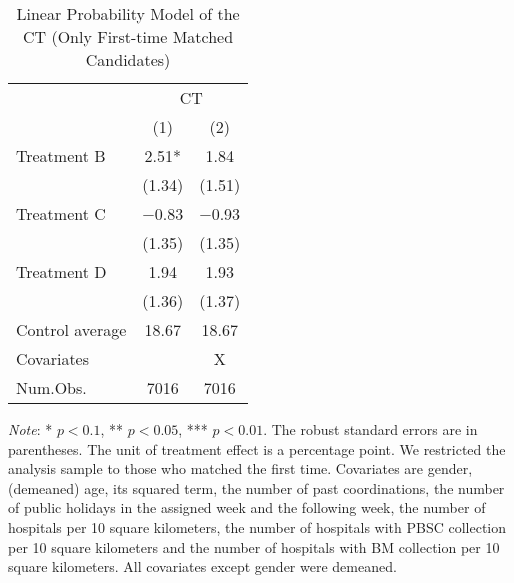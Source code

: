 \documentclass[12pt, a4paper]{article}
\begin{document}
\begin{table}[H]

\caption{\label{tab:lm-test-initial}Linear Probability Model of the CT (Only First-time Matched Candidates)}
\centering
\fontsize{8}{10}\selectfont
\begin{threeparttable}
\begin{tabular}[t]{>{\raggedright\arraybackslash}p{20em}cc}
\toprule
\multicolumn{1}{c}{ } & \multicolumn{2}{c}{CT} \\
\cmidrule(l{3pt}r{3pt}){2-3}
  & (1) & (2)\\
\midrule
Treatment B & \num{2.51}* & \num{1.84}\\
 & (\num{1.34}) & (\num{1.51})\\
Treatment C & \num{-0.83} & \num{-0.93}\\
 & (\num{1.35}) & (\num{1.35})\\
Treatment D & \num{1.94} & \num{1.93}\\
 & (\num{1.36}) & (\num{1.37})\\
\midrule
Control average & 18.67 & 18.67\\
Covariates &  & X\\
Num.Obs. & \num{7016} & \num{7016}\\
\bottomrule
\end{tabular}
\begin{tablenotes}
\item \emph{Note}: * $p < 0.1$, ** $p < 0.05$, *** $p < 0.01$. The robust standard errors are in parentheses. The unit of treatment effect is a percentage point. We restricted the analysis sample to those who matched the first time. Covariates are gender, (demeaned) age, its squared term, the number of past coordinations, the number of public holidays in the assigned week and the following week, the number of hospitals per 10 square kilometers, the number of hospitals with PBSC collection per 10 square kilometers and the number of hospitals with BM collection per 10 square kilometers. All covariates except gender were demeaned.
\end{tablenotes}
\end{threeparttable}
\end{table}
\end{document}
